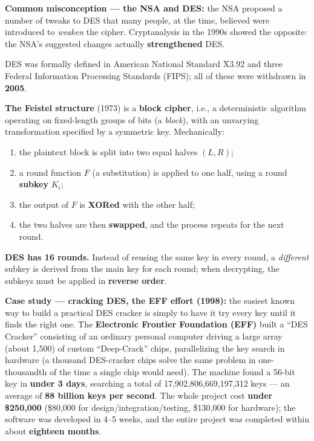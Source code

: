 \documentclass[12pt, a4paper]{article}
\begin{document}
\textcolor{ForestGreen!60!black}{\textbf{Common misconception --- the NSA and DES:}} the NSA proposed a number of tweaks to DES that many people, at the time, believed were introduced to \emph{weaken} the cipher. Cryptanalysis in the 1990s showed the opposite: the NSA's suggested changes actually \textbf{strengthened} DES.

DES was formally defined in American National Standard X3.92 and three Federal Information Processing Standards (FIPS); all of these were withdrawn in \textbf{2005}.

\textbf{The Feistel structure} (1973) is a \textbf{block cipher}, i.e., a deterministic algorithm operating on fixed-length groups of bits (a \emph{block}), with an unvarying transformation specified by a symmetric key. Mechanically:
\begin{enumerate}
    \item the plaintext block is split into two equal halves $(L,R)$;
    \item a round function $F$ (a substitution) is applied to one half, using a round \textbf{subkey} $K_i$;
    \item the output of $F$ is \textbf{XORed} with the other half;
    \item the two halves are then \textbf{swapped}, and the process repeats for the next round.
\end{enumerate}
\textbf{DES has 16 rounds.} Instead of reusing the same key in every round, a \emph{different} subkey is derived from the main key for each round; when decrypting, the subkeys must be applied in \textbf{reverse order}.

\textbf{Case study --- cracking DES, the EFF effort (1998):} the easiest known way to build a practical DES cracker is simply to have it try every key until it finds the right one. The \textbf{Electronic Frontier Foundation (EFF)} built a ``DES Cracker'' consisting of an ordinary personal computer driving a large array (about 1{,}500) of custom ``Deep-Crack'' chips, parallelizing the key search in hardware (a thousand DES-cracker chips solve the same problem in one-thousandth of the time a single chip would need). The machine found a 56-bit key in \textbf{under 3 days}, searching a total of 17,902,806,669,197,312 keys --- an average of \textbf{88 billion keys per second}. The whole project cost \textbf{under \$250{,}000} (\$80{,}000 for design/integration/testing, \$130{,}000 for hardware); the software was developed in 4--5 weeks, and the entire project was completed within about \textbf{eighteen months}.
\end{document}
